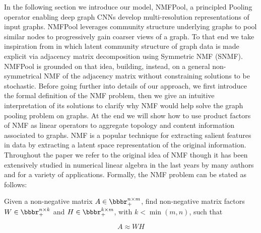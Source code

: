 \documentclass[runningheads]{llncs}
\begin{document}
In the following section we introduce our model, NMFPool, a principled Pooling operator enabling deep graph CNNs develop multi-resolution representations of input graphs. NMFPool leverages community structure underlying graphs to pool similar nodes to progressively gain coarser views of a graph. To that end we take inspiration from \cite{NIPS2005_2948} in which latent community structure of graph data is made explicit via adjacency matrix decomposition using Symmetric NMF (SNMF). NMFPool is grounded on that idea, building, instead, on a general non-symmetrical NMF of the adjacency matrix without constraining solutions to be stochastic. Before going further into details of our approach, we first introduce the formal definition of the NMF problem, then we give an intuitive interpretation of its solutions to clarify why NMF would help solve the graph pooling problem on graphs. At the end we will show how to use product factors of NMF as linear operators to aggregate topology and content information associated to graphs.
NMF is a popular technique for extracting salient features in data by extracting a latent space representation of the original information. Throughout the paper we refer to the original idea of NMF \cite{NIPS2000_1861} though it has been extensively studied in numerical linear algebra in the last years by many authors and for a variety of applications. Formally, the NMF problem can be stated as follows:
\begin{definition}
	Given a non-negative matrix $A \in \bbbr^{n \times m}_{+}$, find non-negative matrix factors $W\in\bbbr^{n \times k}_{+}$ and $H\in\bbbr^{k \times m}_{+}$, with $k < \min(m, n)$, such that
\end{definition}
\begin{equation}\label{nmf-problem}
	A \approx W H
\end{equation}
\end{document}
